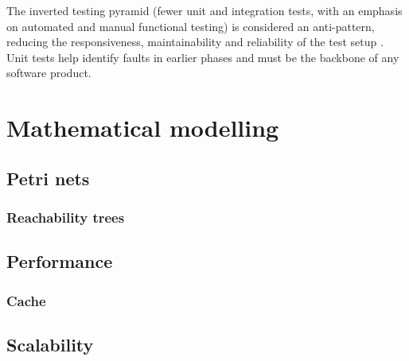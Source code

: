 \documentclass[11pt,spanish]{article} %
\begin{document}
The inverted testing pyramid (fewer unit and integration tests, with an emphasis on automated and manual functional testing) is considered an anti-pattern, reducing the responsiveness, maintainability and reliability of the test setup \cite{test-pyramid}. 
Unit tests help identify faults in earlier phases \cite{test-pyramid} and must be the backbone of any software product.


\newpage
\section{Mathematical modelling}

\subsection{Petri nets}
\subsubsection{Reachability trees}

\subsection{Performance}
\subsubsection{Cache}

\subsection{Scalability}

\newpage


\printbibliography
\end{document}
